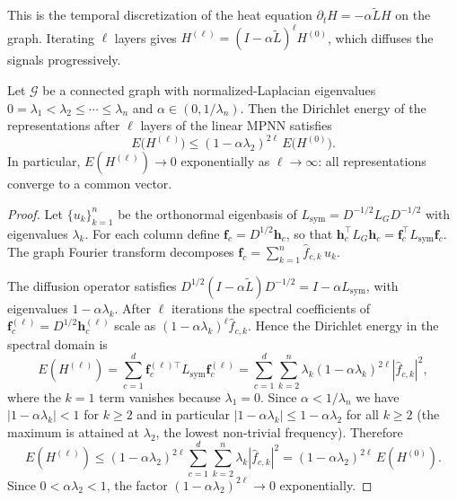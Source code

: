 This is the temporal discretization of the heat equation
$\partial_t H = -\alpha \tilde L H$ on the graph. Iterating $\ell$ layers gives
$H^{(\ell)} = (I - \alpha \tilde L)^\ell H^{(0)}$, which diffuses the signals
progressively.

\begin{theorem}
\label{thm:priors:oversmoothing}
Let $\mathcal{G}$ be a connected graph with normalized-Laplacian eigenvalues
$0 = \lambda_1 < \lambda_2 \le \cdots \le \lambda_n$ and
$\alpha \in (0, 1/\lambda_n)$. Then the Dirichlet energy of the representations
after $\ell$ layers of the linear MPNN satisfies
\[
  E\bigl(H^{(\ell)}\bigr) \le (1 - \alpha \lambda_2)^{2\ell}\, E\bigl(H^{(0)}\bigr).
\]
In particular, $E(H^{(\ell)}) \to 0$ exponentially as $\ell \to \infty$: all
representations converge to a common vector.
\end{theorem}

\begin{proof}
Let $\{u_k\}_{k=1}^{n}$ be the orthonormal eigenbasis of
$L_{\mathrm{sym}} = D^{-1/2} L_G D^{-1/2}$ with eigenvalues $\lambda_k$. For each
column define $\mathbf{f}_c = D^{1/2} \mathbf{h}_c$, so that
$\mathbf{h}_c^{\!\top} L_G \mathbf{h}_c = \mathbf{f}_c^{\!\top} L_{\mathrm{sym}}
\mathbf{f}_c$. The graph Fourier transform decomposes
$\mathbf{f}_c = \sum_{k=1}^{n} \hat f_{c,k}\, u_k$.

The diffusion operator satisfies
$D^{1/2}(I - \alpha \tilde L) D^{-1/2} = I - \alpha L_{\mathrm{sym}}$, with
eigenvalues $1 - \alpha \lambda_k$. After $\ell$ iterations the spectral
coefficients of $\mathbf{f}_c^{(\ell)} = D^{1/2} \mathbf{h}_c^{(\ell)}$ scale as
$(1 - \alpha \lambda_k)^\ell \hat f_{c,k}$. Hence the Dirichlet energy in the
spectral domain is
\[
  E(H^{(\ell)})
    = \sum_{c=1}^{d} \mathbf{f}_c^{(\ell)\top} L_{\mathrm{sym}} \mathbf{f}_c^{(\ell)}
    = \sum_{c=1}^{d} \sum_{k=2}^{n} \lambda_k (1 - \alpha \lambda_k)^{2\ell}
      |\hat f_{c,k}|^2,
\]
where the $k = 1$ term vanishes because $\lambda_1 = 0$. Since
$\alpha < 1/\lambda_n$ we have $|1 - \alpha \lambda_k| < 1$ for $k \ge 2$ and in
particular $|1 - \alpha \lambda_k| \le 1 - \alpha \lambda_2$ for all $k \ge 2$
(the maximum is attained at $\lambda_2$, the lowest non-trivial frequency).
Therefore
\[
  E(H^{(\ell)})
    \le (1 - \alpha \lambda_2)^{2\ell} \sum_{c=1}^{d} \sum_{k=2}^{n}
        \lambda_k |\hat f_{c,k}|^2
    = (1 - \alpha \lambda_2)^{2\ell}\, E(H^{(0)}).
\]
Since $0 < \alpha \lambda_2 < 1$, the factor $(1 - \alpha \lambda_2)^{2\ell} \to 0$
exponentially. \qedhere
\end{proof}


